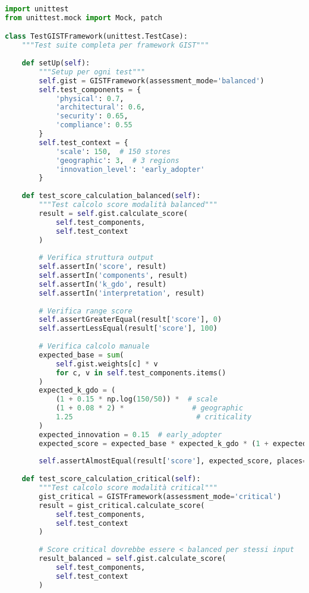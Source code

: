 \begin{lstlisting}[language=Python, caption=Suite di Test per Framework GIST]
import unittest
from unittest.mock import Mock, patch

class TestGISTFramework(unittest.TestCase):
    """Test suite completa per framework GIST"""
    
    def setUp(self):
        """Setup per ogni test"""
        self.gist = GISTFramework(assessment_mode='balanced')
        self.test_components = {
            'physical': 0.7,
            'architectural': 0.6,
            'security': 0.65,
            'compliance': 0.55
        }
        self.test_context = {
            'scale': 150,  # 150 stores
            'geographic': 3,  # 3 regions
            'innovation_level': 'early_adopter'
        }
    
    def test_score_calculation_balanced(self):
        """Test calcolo score modalità balanced"""
        result = self.gist.calculate_score(
            self.test_components, 
            self.test_context
        )
        
        # Verifica struttura output
        self.assertIn('score', result)
        self.assertIn('components', result)
        self.assertIn('k_gdo', result)
        self.assertIn('interpretation', result)
        
        # Verifica range score
        self.assertGreaterEqual(result['score'], 0)
        self.assertLessEqual(result['score'], 100)
        
        # Verifica calcolo manuale
        expected_base = sum(
            self.gist.weights[c] * v 
            for c, v in self.test_components.items()
        )
        expected_k_gdo = (
            (1 + 0.15 * np.log(150/50)) *  # scale
            (1 + 0.08 * 2) *                # geographic
            1.25                             # criticality
        )
        expected_innovation = 0.15  # early_adopter
        expected_score = expected_base * expected_k_gdo * (1 + expected_innovation) * 100
        
        self.assertAlmostEqual(result['score'], expected_score, places=1)
    
    def test_score_calculation_critical(self):
        """Test calcolo score modalità critical"""
        gist_critical = GISTFramework(assessment_mode='critical')
        result = gist_critical.calculate_score(
            self.test_components,
            self.test_context
        )
        
        # Score critical dovrebbe essere < balanced per stessi input
        result_balanced = self.gist.calculate_score(
            self.test_components,
            self.test_context
        )
        

\end{lstlisting}
